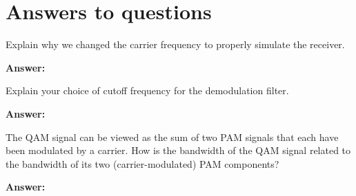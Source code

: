 \documentclass{article}
\begin{document}

\section{Answers to questions}

\begin{enumerate}
  \begin{item}
    Explain why we changed the carrier frequency to properly simulate the receiver. 

  \textbf{Answer:}
  \end{item}

  \begin{item}
    Explain your choice of cutoff frequency for the demodulation filter.

  \textbf{Answer:}
  \end{item}

  \begin{item}
    The QAM signal can be viewed as the sum of two PAM signals that each have been modulated by a carrier. How is the bandwidth of the QAM signal related to the bandwidth of its two (carrier-modulated) PAM components?

  \textbf{Answer:}
  \end{item}
\end{enumerate}
\end{document}
